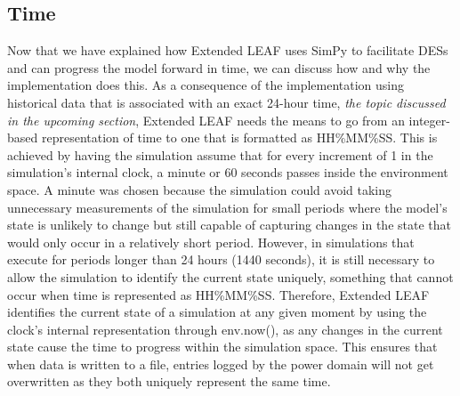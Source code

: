\documentclass{l4proj}
\begin{document}
\subsection{Time}\label{imp:subsec:time}
Now that we have explained how Extended LEAF uses SimPy to facilitate DESs and can progress the model forward in time, we can discuss how and why the implementation does this.
As a consequence of the implementation using historical data that is associated with an exact 24-hour time, \textit{the topic discussed in the upcoming section}, Extended LEAF needs the means to go from an integer-based representation of time to one that is formatted as HH\%MM\%SS.
This is achieved by having the simulation assume that for every increment of 1 in the simulation's internal clock, a minute or 60 seconds passes inside the environment space.
A minute was chosen because the simulation could avoid taking unnecessary measurements of the simulation for small periods where the model's state is unlikely to change but still capable of capturing changes in the state that would only occur in a relatively short period.
However, in simulations that execute for periods longer than 24 hours (1440 seconds), it is still necessary to allow the simulation to identify the current state uniquely, something that cannot occur when time is represented as HH\%MM\%SS. Therefore, Extended LEAF identifies the current state of a simulation at any given moment by using the clock's internal representation through env.now(), as any changes in the current state cause the time to progress within the simulation space.
This ensures that when data is written to a file, entries logged by the power domain will not get overwritten as they both uniquely represent the same time.
\end{document}
